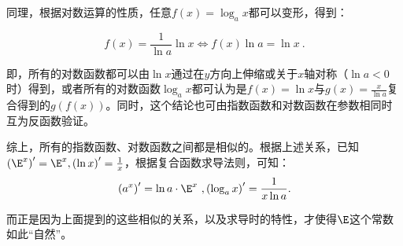 同理，根据对数运算的性质，任意$f(x)=\log_ax$都可以变形，得到：

\begin{equation}
f(x)=\frac{1}{\ln a}\ln x\iff f(x)\ln a=\ln x~.
\end{equation}

即，所有的对数函数都可以由$\ln x$通过在$y$方向上伸缩或关于$x$轴对称（$\ln a<0$时）得到，或者所有的对数函数$\log_ax$都可认为是$f(x)=\ln x$与$\displaystyle g(x)=\frac{x}{\ln a}$复合得到的$g(f(x))$。同时，这个结论也可由指数函数和对数函数在参数相同时互为反函数验证。

综上，所有的指数函数、对数函数之间都是相似的。根据上述关系，已知$\left(\E^x\right)'=\E^x,\left(\ln x\right)'=\frac{1}{x}$，根据复合函数求导法则，可知：
\begin{equation}
\left(a^x\right)'=\ln a\cdot\E^x~,\left(\log_a x\right)'=\frac{1}{x\ln a}.
\end{equation}

而正是因为上面提到的这些相似的关系，以及求导时的特性，才使得$\E$这个常数如此“自然”。
